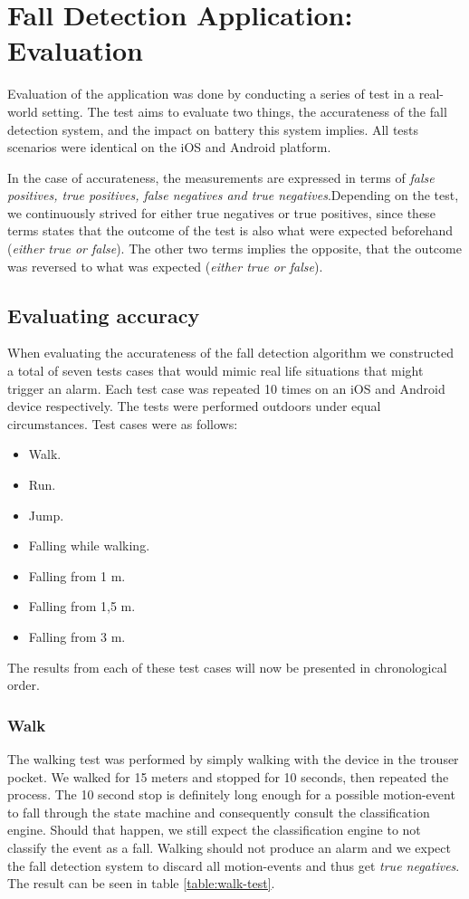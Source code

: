 \documentclass[12pt, a4paper, onecolumn]{article}
\begin{document}
	\section{Fall Detection Application: Evaluation}
		Evaluation of the application was done by conducting a series of test in a real-world setting. The test aims to evaluate two things, the accurateness of the fall detection system, and the impact on battery this system implies. All tests scenarios were identical on the iOS and Android platform. 
		
		In the case of accurateness, the measurements are expressed in terms of \textit{false positives, true positives, false negatives and true negatives}.Depending on the test, we continuously strived for either true negatives or true positives, since these terms states that the outcome of the test is also what were expected  beforehand (\textit{either true or false}). The other two terms implies the opposite, that the outcome was reversed to what was expected (\textit{either true or false}).
		
	
		
	\subsection{Evaluating accuracy} 
		When evaluating the accurateness of the fall detection algorithm we constructed a total of seven tests cases that would mimic real life situations that might trigger an alarm. Each test case was repeated 10 times on an iOS and Android device respectively. The tests were performed outdoors under equal circumstances. Test cases were as follows:
			\begin{itemize}
				\item Walk.
				\item Run.
				\item Jump.
				\item Falling while walking.
				\item Falling from 1 m.
				\item Falling from 1,5 m.
				\item Falling from 3 m.
			\end{itemize}
		
		
	The results from each of these test cases will now be presented in chronological order. 
	
		\subsubsection{Walk} 
		The walking test was performed by simply walking with the device in the trouser pocket. We walked for 15 meters and stopped for 10 seconds, then repeated the process. The 10 second stop is definitely long enough for a possible motion-event to fall through the state machine and consequently consult the classification engine. Should that happen, we still expect the classification engine to not classify the event as a fall. Walking should not produce an alarm and we expect the fall detection system to discard all motion-events and thus get \textit{true negatives}. The result can be seen in table \ref{table:walk-test}. 
		
\end{document}
